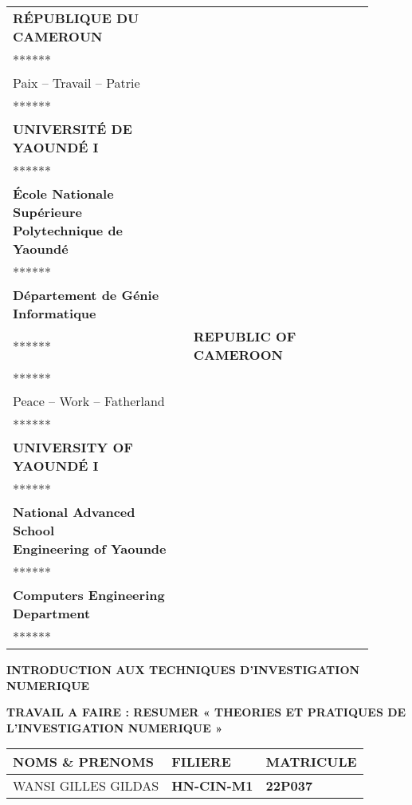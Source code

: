 \documentclass[12pt, a4paper]{article}
\begin{document}
\begin{titlepage}
    \centering

   

    \begin{tabular}{p{0.45\linewidth} p{0.45\linewidth}}
\centering
\textbf{RÉPUBLIQUE DU CAMEROUN}\\
******\\
Paix -- Travail -- Patrie\\
******\\
\textbf{UNIVERSITÉ DE YAOUNDÉ I}\\
******\\
\textbf {École Nationale Supérieure\\
Polytechnique de Yaoundé}\\
******\\
\textbf {Département de Génie Informatique}\\
****** &
\centering
\textbf{REPUBLIC OF CAMEROON}\\
******\\
Peace -- Work -- Fatherland\\
******\\
\textbf{UNIVERSITY OF YAOUNDÉ I}\\
******\\
\textbf {National Advanced School\\
Engineering of Yaounde}\\
******\\
\textbf {Computers Engineering Department}\\
****** \\
\end{tabular}
\vspace{3 cm}

    \begin{LARGE}

    \textbf{INTRODUCTION AUX TECHNIQUES D'INVESTIGATION NUMERIQUE}
    \end{LARGE}

    \vspace{2cm}

    \textbf{TRAVAIL A FAIRE : RESUMER « THEORIES ET PRATIQUES DE L'INVESTIGATION NUMERIQUE »}

    \vspace{5cm}

    \begin{tabular}{|>{\centering\arraybackslash}p{5cm}|>{\centering\arraybackslash}p{3cm}|>{\centering\arraybackslash}p{3cm}|}
        \hline
        \textbf{NOMS \& PRENOMS} & \textbf{FILIERE  } & \textbf{MATRICULE} \\
        \hline
        WANSI GILLES GILDAS & \textbf{HN-CIN-M1} & \textbf{22P037} \\
        \hline
    \end{tabular}


\end{titlepage}
\end{document}
